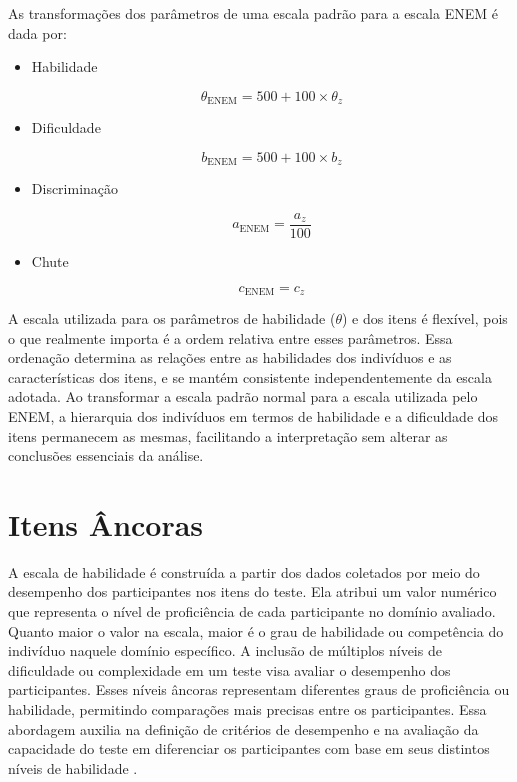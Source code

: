 As transformações dos parâmetros de uma escala padrão para a escala ENEM é dada por:
\begin{itemize}
	
\item Habilidade

\[
	\theta_{\text{ENEM}} = 500 + 100 \times \theta_z
\]




\item Dificuldade

 
 \[
 b_{\text{ENEM}} = 500 + 100 \times b_z 
 \]
 
 \item Discriminação
 
 \[
 	a_{\text{ENEM}} = \frac{a_z}{100}
 \]
 
 \item Chute
 
 \[
 c_{\text{ENEM}} = c_z
 \]
\end{itemize}


A escala utilizada para os parâmetros de habilidade ($\theta$) e dos itens é flexível, pois o que realmente importa é a ordem relativa entre esses parâmetros. Essa ordenação determina as relações entre as habilidades dos indivíduos e as características dos itens, e se mantém consistente independentemente da escala adotada. Ao transformar a escala padrão normal  para a escala utilizada pelo ENEM, a hierarquia dos indivíduos em termos de habilidade e a dificuldade dos itens permanecem as mesmas, facilitando a interpretação sem alterar as conclusões essenciais da análise.
 




\section{Itens Âncoras}

A escala de habilidade é construída a partir dos dados coletados por meio do desempenho dos participantes nos itens do teste. Ela atribui um valor numérico que representa o nível de proficiência de cada participante no domínio avaliado. Quanto maior o valor na escala, maior é o grau de habilidade ou competência do indivíduo naquele domínio específico. A inclusão de múltiplos níveis de dificuldade ou complexidade em um teste visa avaliar o desempenho dos participantes. Esses níveis âncoras representam diferentes graus de proficiência ou habilidade, permitindo comparações mais precisas entre os participantes. Essa abordagem auxilia na definição de critérios de desempenho e na avaliação da capacidade do teste em diferenciar os participantes com base em seus distintos níveis de habilidade \cite{valle2001}.

